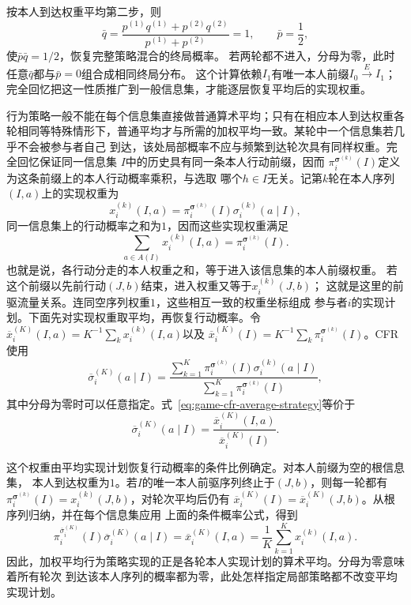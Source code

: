 按本人到达权重平均第二步，则
\[
 \bar q=
 \frac{p^{(1)}q^{(1)}+p^{(2)}q^{(2)}}{p^{(1)}+p^{(2)}}=1,
 \qquad \bar p=\frac12,
\]
使$\bar p\bar q=1/2$，恢复完整策略混合的终局概率。
若两轮都不进入，分母为零，此时任意$\bar q$都与$\bar p=0$组合成相同终局分布。
这个计算依赖$I_1$有唯一本人前缀$I_0\xrightarrow{E}I_1$；
完全回忆把这一性质推广到一般信息集，才能逐层恢复平均后的实现权重。

行为策略一般不能在每个信息集直接做普通算术平均；只有在相应本人到达权重各轮相同等特殊情形下，普通平均才与所需的加权平均一致。某轮中一个信息集若几乎不会被参与者自己
到达，该处局部概率不应与频繁到达轮次具有同样权重。完全回忆保证同一信息集
\(I\)中的历史具有同一条本人行动前缀，因而
\(\pi_i^{\bm{\sigma}^{(k)}}(I)\)定义为这条前缀上的本人行动概率乘积，与选取
哪个\(h\in I\)无关。记第\(k\)轮在本人序列\((I,a)\)上的实现权重为
\[
  x_i^{(k)}(I,a)
  =
  \pi_i^{\bm{\sigma}^{(k)}}(I)
  \sigma_i^{(k)}(a\mid I),
\]
同一信息集上的行动概率之和为\(1\)，因而这些实现权重满足
\[
  \sum_{a\in A(I)}x_i^{(k)}(I,a)
  =\pi_i^{\bm{\sigma}^{(k)}}(I).
\]
也就是说，各行动分走的本人权重之和，等于进入该信息集的本人前缀权重。
若这个前缀以先前行动\((J,b)\)结束，进入权重又等于\(x_i^{(k)}(J,b)\)；
这就是这里的前驱流量关系。连同空序列权重\(1\)，这些相互一致的权重坐标组成
参与者\(i\)的实现计划。下面先对实现权重取平均，再恢复行动概率。令
\(\overline{x}_i^{(K)}(I,a)=K^{-1}\sum_k x_i^{(k)}(I,a)\)以及
\(\overline{x}_i^{(K)}(I)=K^{-1}\sum_k
\pi_i^{\bm{\sigma}^{(k)}}(I)\)。CFR使用
\begin{equation}
  \overline{\sigma}_i^{(K)}(a\mid I)
  =
  \frac{
    \sum_{k=1}^{K}
    \pi_i^{\bm{\sigma}^{(k)}}(I)
    \sigma_i^{(k)}(a\mid I)
  }{
    \sum_{k=1}^{K}
    \pi_i^{\bm{\sigma}^{(k)}}(I)
  },
  \label{eq:game-cfr-average-strategy}
\end{equation}
其中分母为零时可以任意指定。式~\eqref{eq:game-cfr-average-strategy}等价于
\[
  \overline{\sigma}_i^{(K)}(a\mid I)
  =
  \frac{\overline{x}_i^{(K)}(I,a)}{\overline{x}_i^{(K)}(I)}.
\]

这个权重由平均实现计划恢复行动概率的条件比例确定。对本人前缀为空的根信息集，
本人到达权重为\(1\)。若\(I\)的唯一本人前驱序列终止于\((J,b)\)，则每一轮都有
\(\pi_i^{\bm{\sigma}^{(k)}}(I)=x_i^{(k)}(J,b)\)，对轮次平均后仍有
\(\overline{x}_i^{(K)}(I)=\overline{x}_i^{(K)}(J,b)\)。从根序列归纳，并在每个信息集应用
上面的条件概率公式，得到
\begin{equation}
  \pi_i^{\overline{\sigma}_i^{(K)}}(I)
  \overline{\sigma}_i^{(K)}(a\mid I)
  =
  \overline{x}_i^{(K)}(I,a)
  =
  \frac{1}{K}\sum_{k=1}^{K}x_i^{(k)}(I,a).
  \label{eq:game-average-realization-plan}
\end{equation}
因此，加权平均行为策略实现的正是各轮本人实现计划的算术平均。分母为零意味着所有轮次
到达该本人序列的概率都为零，此处怎样指定局部策略都不改变平均实现计划。


